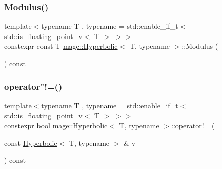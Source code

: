 \mbox{\label{structmage_1_1_hyperbolic_a6ca0036618e4e28f89e462cc945eacaf}} 
\subsubsection{\texorpdfstring{Modulus()}{Modulus()}}
{\footnotesize\ttfamily template$<$typename T , typename  = std\+::enable\+\_\+if\+\_\+t$<$ std\+::is\+\_\+floating\+\_\+point\+\_\+v$<$ T $>$ $>$$>$ \\
constexpr const T \mbox{\hyperlink{structmage_1_1_hyperbolic}{mage\+::\+Hyperbolic}}$<$ T, typename $>$\+::Modulus (\begin{DoxyParamCaption}{ }\end{DoxyParamCaption}) const\hspace{0.3cm}{\ttfamily [noexcept]}}

\mbox{\label{structmage_1_1_hyperbolic_ad278371ef6d082686faa09615d44cd44}} 
\subsubsection{\texorpdfstring{operator"!=()}{operator!=()}}
{\footnotesize\ttfamily template$<$typename T , typename  = std\+::enable\+\_\+if\+\_\+t$<$ std\+::is\+\_\+floating\+\_\+point\+\_\+v$<$ T $>$ $>$$>$ \\
constexpr bool \mbox{\hyperlink{structmage_1_1_hyperbolic}{mage\+::\+Hyperbolic}}$<$ T, typename $>$\+::operator!= (\begin{DoxyParamCaption}\item[{const \mbox{\hyperlink{structmage_1_1_hyperbolic}{Hyperbolic}}$<$ T, typename $>$ \&}]{v }\end{DoxyParamCaption}) const}

\mbox{\label{structmage_1_1_hyperbolic_a1707d012d955bad4f580827e89d2ce5c}} 
